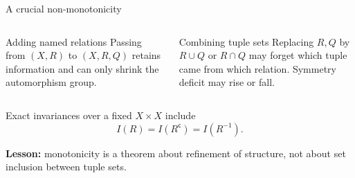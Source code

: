 \begin{frame}{A crucial non-monotonicity}
  \begin{columns}[T]
      \begin{block}{Adding named relations}
        Passing from $(X,R)$ to $(X,R,Q)$ retains information and can only
        shrink the automorphism group.
      \end{block}
      \begin{alertblock}{Combining tuple sets}
        Replacing $R,Q$ by $R\cup Q$ or $R\cap Q$ may forget which tuple came
        from which relation. Symmetry deficit may rise or fall.
      \end{alertblock}
  \end{columns}

  \vspace{0.8em}
  Exact invariances over a fixed $X\times X$ include
  \[
    I(R)=I(R^{\mathsf c})=I(R^{-1}).
  \]

  \textbf{Lesson:} monotonicity is a theorem about refinement of structure,
  not about set inclusion between tuple sets.
\end{frame}
